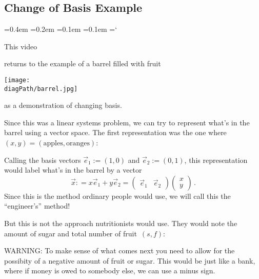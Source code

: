 
\subsection*{Change of Basis Example}

{\ttfamily
{}\font=0.4em
\font=0.2em
\font=0.1em
\font=0.1em
\hyphenchar\font=`\-


\hypertarget{scripts_diagonalization_basis}{This video} returns to 
the example of a barrel filled with fruit
\begin{center}
\texttt{[image: \\diagPath/barrel.jpg]}
\end{center}
as a demonstration of changing basis.

Since this was a linear systems problem, we can try to represent what's in the barrel using a vector space. The first representation was the one
where $(x,y)=(\mbox{apples},\mbox{oranges})$:
\vspace{2mm}
\begin{center}
\end{center}
Calling the basis vectors $\vec e_1:=(1,0)$ and $\vec e_2:=(0,1)$, 
this representation would label what's in the barrel by a vector 
$$
\vec x: = x \vec e_1 + y\vec e_2 = \begin{pmatrix}\vec e_1 & \vec e_2\end{pmatrix}\begin{pmatrix}x \\ y\end{pmatrix}\, .
$$
Since this is the method ordinary people would use, we will call this the
``engineer's'' method!


But this is not the approach nutritionists would use. They would note the amount of sugar and total number of fruit~$(s,f)$:
\begin{center}
\end{center}
WARNING: To make sense of what comes next you need to allow for the possibity of a negative amount of fruit or sugar. This would be just like a bank, where if money is owed to somebody else, we can use a minus sign.

}
